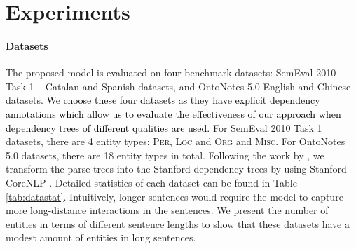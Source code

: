 \documentclass[11pt]{article}
\begin{document}
\section{Experiments}
\label{sec:results}
\paragraph{Datasets}
The proposed model is evaluated on four benchmark datasets:  SemEval 2010 Task 1
~\cite{recasens2010semeval} Catalan and Spanish datasets, and OntoNotes 5.0 \cite{weischedel2013ontonotes} English and Chinese datasets. 
\textcolor{black}{We choose these four datasets as they have explicit dependency annotations which allow us to evaluate the effectiveness of our approach when dependency trees of different qualities are used.}
For SemEval 2010 Task 1 datasets, there are 4 entity types: \textsc{Per}, \textsc{Loc} and \textsc{Org} and \textsc{Misc}.
For OntoNotes 5.0 datasets, there are 18 entity types in total. 
Following the work by \citet{Jie2019DependencyGuidedLF}, we transform the parse trees into the Stanford dependency trees \cite{de2008stanford} by using Stanford CoreNLP \cite{manning-etal-2014-stanford}. 
Detailed statistics of each dataset can be found in Table \ref{tab:datastat}.
Intuitively, longer sentences would require the model to capture more long-distance interactions in the sentences.
We present the number of entities in terms of different sentence lengths to show that these datasets have a modest amount of entities in long sentences. 
\end{document}
